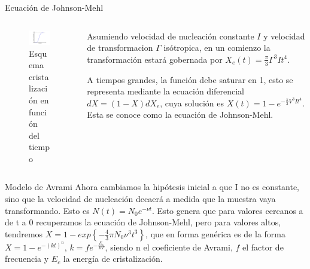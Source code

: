 \documentclass[11pt]{beamer}
\begin{document}
		\begin{frame}{Ecuación de Johnson-Mehl}
			\begin{columns}[T]	
				\begin{column}{.4\textwidth}
					\begin{figure}
						\includegraphics[scale=0.3]{img/cristalization_vs_tiempo.png}
						\caption*{Esquema cristalización en función del tiempo}
					\end{figure}
				\end{column}
				\begin{column}{.59\textwidth}
					Asumiendo velocidad de nucleación constante $I$ y velocidad de transformacion $\Gamma$ isótropica, en un comienzo la transformación estará gobernada por $X_e(t) = \frac{\pi}{3}\Gamma^3 I t^4$.
					
					A tiempos grandes, la función debe saturar en 1, esto se representa mediante la ecuación diferencial $dX = (1 - X)dX_e$, cuya solución es $X(t)=1-e^{-\frac{\pi}{3}V^3 I t^4}$. Esta se conoce como la ecuación de Johnson-Mehl.
				\end{column}
			\end{columns}
		\end{frame}
		\begin{frame}{Modelo de Avrami}
		Ahora cambiamos la hipótesis inicial a que I no es constante, sino que la velocidad de nucleación decaerá a medida que la muestra vaya transformando. Esto es $N(t) = N_0e^{-\nu t}$. Esto genera que para valores cercanos a de t a 0 recuperamos la ecuación de Johnson-Mehl, pero para valores altos, tendremos $X = 1 - exp\left\lbrace -\frac{4}{3} \pi N_0 \nu^3 t^3 \right\rbrace$, que en forma genérica es de la forma $X = 1 - e^{-(kt)^n}$, $k=fe^{-\frac{E_c}{RT}}$, siendo n el coeficiente de Avrami, $f$ el factor de frecuencia y $E_c$ la energía de cristalización.
		\end{frame}
		
\end{document}
